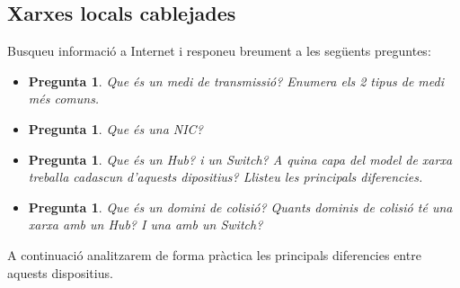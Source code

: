 \documentclass[12pt,a4paper]{article}
\newcounter{exercises}
\newtheorem{exer}[exercises]{Pregunta}
\begin{document}
\subsection{Xarxes locals cablejades}

Busqueu informació a Internet i responeu breument a les següents preguntes:

\begin{itemize}
\item \begin{exer}Que és un medi de transmissió? Enumera els 2 tipus de medi més comuns.\end{exer}
\item  \begin{exer} Que és una NIC?\end{exer}
\item \begin{exer}Que és un Hub? i un Switch? A quina capa del model de xarxa treballa cadascun d'aquests dipositius? Llisteu les principals diferencies.\end{exer}
\item \begin{exer}Que és un domini de colisió? Quants dominis de colisió té una xarxa amb un Hub? I una amb un Switch?\end{exer}
\end{itemize}

A continuació analitzarem de forma pràctica les principals diferencies entre aquests dispositius.
\end{document}
